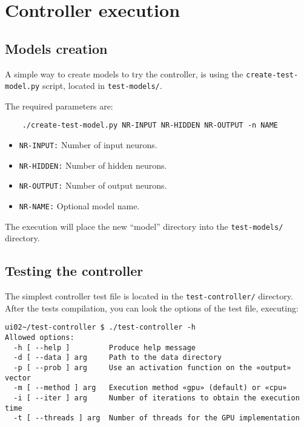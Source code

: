 \section{Controller execution}

\subsection*{Models creation}

A simple way to create models to try the controller,
is using the \texttt{create-test-model.py} script,
located in \texttt{test-models/}.

The required parameters are:

\begin{verbatim}
    ./create-test-model.py NR-INPUT NR-HIDDEN NR-OUTPUT -n NAME
\end{verbatim}

\begin{itemize}
    \item \texttt{NR-INPUT:} Number of input neurons.
    \item \texttt{NR-HIDDEN:} Number of hidden neurons.
    \item \texttt{NR-OUTPUT:} Number of output neurons.
    \item \texttt{NR-NAME:} Optional model name.
\end{itemize}

The execution will place the new ``model'' directory
into the \texttt{test-models/} directory.

\subsection*{Testing the controller}

The simplest controller test file is located in the \texttt{test-controller/} directory.
After the tests compilation, you can look the options of the test file,
executing:

\begin{verbatim}
ui02~/test-controller $ ./test-controller -h
Allowed options:
  -h [ --help ]         Produce help message
  -d [ --data ] arg     Path to the data directory
  -p [ --prob ] arg     Use an activation function on the «output» vector
  -m [ --method ] arg   Execution method «gpu» (default) or «cpu»
  -i [ --iter ] arg     Number of iterations to obtain the execution time
  -t [ --threads ] arg  Number of threads for the GPU implementation
\end{verbatim}

